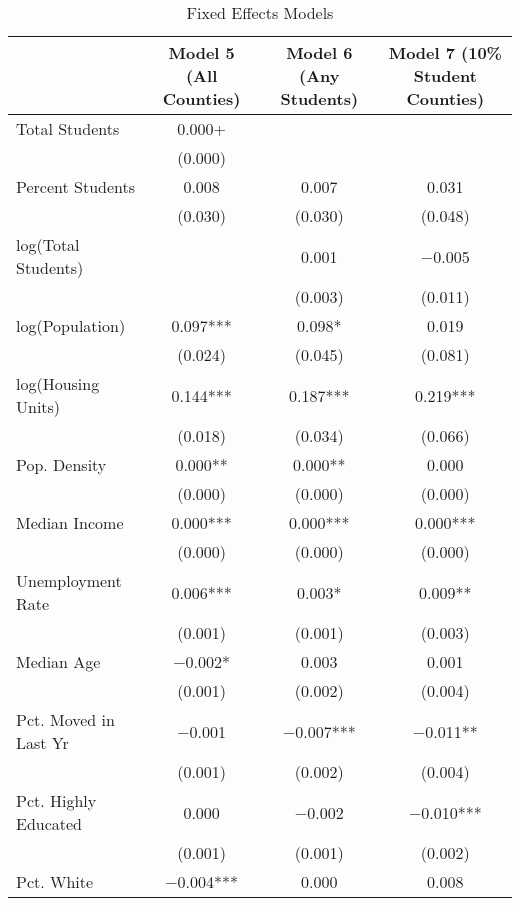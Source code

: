 \documentclass[12pt,english]{article}
\begin{document}
\begin{table*}[p]
\begin{adjustwidth}{-1in}{-1in} %
\caption{Fixed Effects Models}
\label{tab:femodels}
\centering
\begin{tabular}[t]{lccc}
\toprule
  & Model 5 (All Counties) & Model 6 (Any Students) & Model 7 (10\% Student Counties)\\
\midrule
Total Students & \num{0.000}+ &  & \\
 & (\num{0.000}) &  & \\
Percent Students & \num{0.008} & \num{0.007} & \num{0.031}\\
 & (\num{0.030}) & (\num{0.030}) & (\num{0.048})\\
log(Total Students) &  & \num{0.001} & \num{-0.005}\\
 &  & (\num{0.003}) & (\num{0.011})\\
log(Population) & \num{0.097}*** & \num{0.098}* & \num{0.019}\\
 & (\num{0.024}) & (\num{0.045}) & (\num{0.081})\\
log(Housing Units) & \num{0.144}*** & \num{0.187}*** & \num{0.219}***\\
 & (\num{0.018}) & (\num{0.034}) & (\num{0.066})\\
Pop. Density & \num{0.000}** & \num{0.000}** & \num{0.000}\\
 & (\num{0.000}) & (\num{0.000}) & \vphantom{2} (\num{0.000})\\
Median Income & \num{0.000}*** & \num{0.000}*** & \num{0.000}***\\
 & (\num{0.000}) & (\num{0.000}) & \vphantom{1} (\num{0.000})\\
Unemployment Rate & \num{0.006}*** & \num{0.003}* & \num{0.009}**\\
 & (\num{0.001}) & (\num{0.001}) & (\num{0.003})\\
Median Age & \num{-0.002}* & \num{0.003} & \num{0.001}\\
 & (\num{0.001}) & (\num{0.002}) & \vphantom{1} (\num{0.004})\\
Pct. Moved in Last Yr & \num{-0.001} & \num{-0.007}*** & \num{-0.011}**\\
 & (\num{0.001}) & (\num{0.002}) & (\num{0.004})\\
Pct. Highly Educated & \num{0.000} & \num{-0.002} & \num{-0.010}***\\
 & (\num{0.001}) & (\num{0.001}) & (\num{0.002})\\
Pct. White & \num{-0.004}*** & \num{0.000} & \num{0.008}\\

\end{tabular}
\end{adjustwidth}
\end{table*}
\end{document}
